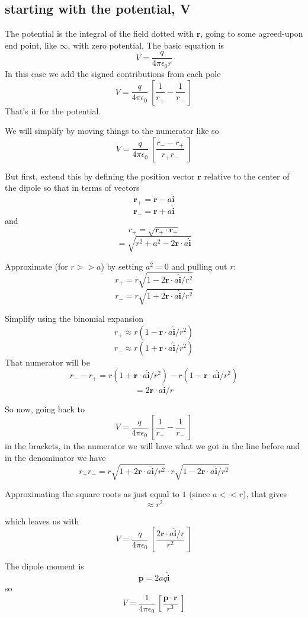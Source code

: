 \documentclass[11pt, oneside]{article}
\begin{document}
\subsection*{starting with the potential, V}

The potential is the integral of the field dotted with $\mathbf{r}$, going to some agreed-upon end point, like $\infty$, with zero potential.  The basic equation is
\[ V = \frac{q}{4 \pi \epsilon_0 r} \]
In this case we add the signed contributions from each pole
\[ V = \frac{q}{4 \pi \epsilon_0} \ [ \frac{1}{r_+} -  \frac{1}{r_-}  \ ] \]
That's it for the potential.

We will simplify by moving things to the numerator like so
\[ V = \frac{q}{4 \pi \epsilon_0} \ [ \frac{r_- - r_+}{r_+ r_-}  \ ] \]

But first, extend this by defining the position vector $\mathbf{r}$ relative to the center of the dipole so that in terms of vectors
\[ \mathbf{r}_+ = \mathbf{r} - a \mathbf{\hat{i}} \]
\[ \mathbf{r}_- = \mathbf{r} + a \mathbf{\hat{i}} \]
and
\[ r_+ = \sqrt{\mathbf{r}_+ \cdot \mathbf{r}_+} \]
\[ = \sqrt{r^2 + a^2 - 2 \mathbf{r} \cdot a \mathbf{\hat{i}}} \]

Approximate (for $r >> a$) by setting $a^2 = 0$ and pulling out $r$:
\[ r_+ = r \sqrt{1 - 2 \mathbf{r} \cdot a \mathbf{\hat{i}}/r^2}  \]
\[ r_- = r \sqrt{1 + 2 \mathbf{r} \cdot a \mathbf{\hat{i}}/r^2}  \]

Simplify using the binomial expansion
\[ r_+  \approx r(1 - \mathbf{r} \cdot a \mathbf{\hat{i}}/r^2) \]
\[ r_-  \approx r(1 + \mathbf{r} \cdot a \mathbf{\hat{i}}/r^2) \]
That numerator will be
\[ r_- - r_+ = r(1 + \mathbf{r} \cdot a \mathbf{\hat{i}}/r^2) - r(1 - \mathbf{r} \cdot a \mathbf{\hat{i}}/r^2) \]
\[ = 2 \mathbf{r} \cdot a \mathbf{\hat{i}}/r \]

So now, going back to
\[ V = \frac{q}{4 \pi \epsilon_0} \ [ \frac{1}{r_+} -  \frac{1}{r_-}  \ ] \]
in the brackets, in the numerator we will have what we got in the line before and in the denominator we have
\[ r_+ r_- = r \sqrt{1 + 2 \mathbf{r} \cdot a \mathbf{\hat{i}}/r^2} \cdot r \sqrt{1 - 2 \mathbf{r} \cdot a \mathbf{\hat{i}}/r^2} \]

Approximating the square roots as just equal to $1$ (since $a << r$), that gives
\[ \approx r^2 \]

which leaves us with
\[ V = \frac{q}{4 \pi \epsilon_0} \ [ \frac{2 \mathbf{r} \cdot a \mathbf{\hat{i}}/r}{r^2}  \ ] \]

The dipole moment is
\[ \mathbf{p} = 2 a q \mathbf{\hat{i}} \]
so
\[ V = \frac{1}{4 \pi \epsilon_0} \ [ \frac{\mathbf{p} \cdot \mathbf{r}}{r^3}  \ ] \]
\end{document}
